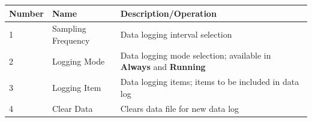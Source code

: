 \begin{longtable}[]{@{}lll@{}}
\toprule
\begin{minipage}[b]{0.15\columnwidth}\raggedright
Number\strut
\end{minipage} & \begin{minipage}[b]{0.37\columnwidth}\raggedright
Name\strut
\end{minipage} & \begin{minipage}[b]{0.40\columnwidth}\raggedright
Description/Operation\strut
\end{minipage}\tabularnewline
\midrule
\endhead
\begin{minipage}[t]{0.15\columnwidth}\raggedright
1\strut
\end{minipage} & \begin{minipage}[t]{0.37\columnwidth}\raggedright
Sampling Frequency\strut
\end{minipage} & \begin{minipage}[t]{0.40\columnwidth}\raggedright
Data logging interval selection\strut
\end{minipage}\tabularnewline
\begin{minipage}[t]{0.15\columnwidth}\raggedright
2\strut
\end{minipage} & \begin{minipage}[t]{0.37\columnwidth}\raggedright
Logging Mode\strut
\end{minipage} & \begin{minipage}[t]{0.40\columnwidth}\raggedright
Data logging mode selection; available in \textbf{Always} and
\textbf{Running}\strut
\end{minipage}\tabularnewline
\begin{minipage}[t]{0.15\columnwidth}\raggedright
3\strut
\end{minipage} & \begin{minipage}[t]{0.37\columnwidth}\raggedright
Logging Item\strut
\end{minipage} & \begin{minipage}[t]{0.40\columnwidth}\raggedright
Data logging items; items to be included in data log\strut
\end{minipage}\tabularnewline
\begin{minipage}[t]{0.15\columnwidth}\raggedright
4\strut
\end{minipage} & \begin{minipage}[t]{0.37\columnwidth}\raggedright
Clear Data\strut
\end{minipage} & \begin{minipage}[t]{0.40\columnwidth}\raggedright
Clears data file for new data log\strut
\end{minipage}\tabularnewline
\bottomrule
\end{longtable}

